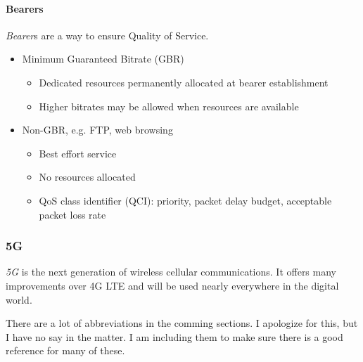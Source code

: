 \paragraph{Bearers}\label{par:Bearers}
\begin{definition}[Bearer]\label{def:Bearer}
  \emph{Bearer}s are a way to ensure Quality of Service.

  \begin{itemize}[noitemsep]
  \item Minimum Guaranteed Bitrate (GBR)
    \begin{itemize}[noitemsep]
    \item Dedicated resources permanently allocated at bearer establishment
    \item Higher bitrates may be allowed when resources are available
    \end{itemize}

  \item Non-GBR, e.g. FTP, web browsing
    \begin{itemize}[noitemsep]
    \item Best effort service
    \item No resources allocated
    \item QoS class identifier (QCI): priority, packet delay budget, acceptable packet loss rate
    \end{itemize}
  \end{itemize}
\end{definition}

\subsubsection{5G}\label{subsubsec:5G}
\begin{definition}[5G]\label{def:5G}
  \emph{5G} is the next generation of wireless cellular communications.
  It offers many improvements over 4G LTE and will be used nearly everywhere in the digital world.
\end{definition}

\begin{remark*}
  There are a lot of abbreviations in the comming sections.
  I apologize for this, but I have no say in the matter.
  I am including them to make sure there is a good reference for many of these.
\end{remark*}

